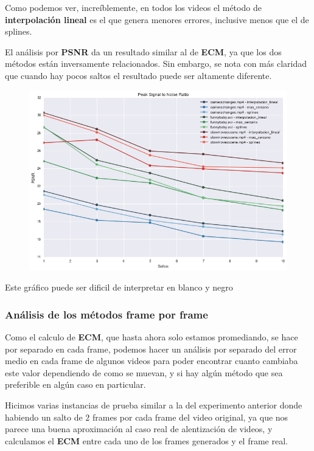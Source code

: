 Como podemos ver, incre\'iblemente, en todos los videos el m\'etodo de \textbf{interpolaci\'on
lineal} es el que genera menores errores, inclusive menos que el de splines.

El an\'alisis por \textbf{PSNR} da un resultado similar al de \textbf{ECM}, ya
que los dos m\'etodos est\'an inversamente relacionados. Sin embargo, se nota
con m\'as claridad que cuando hay pocos saltos el resultado puede ser altamente
diferente.

\begin{figure}[H]
\centering
\includegraphics[width=.95\textwidth]{graficos/psnr.png}
\end{figure}
\vspace{-2em}
\begin{tiny}Este gr\'afico puede ser dificil de interpretar en blanco y negro\end{tiny}
\vspace{2em}

\subsubsection{An\'alisis de los m\'etodos frame por frame}

Como el calculo de \textbf{ECM}, que hasta ahora solo estamos promediando, se
hace por separado en cada frame, podemos hacer un an\'alisis por separado del
error medio en cada frame de algunos videos para poder encontrar cuanto cambiaba
este valor dependiendo de como se muevan, y si hay alg\'un m\'etodo que sea
preferible en alg\'un caso en particular.

Hicimos varias instancias de prueba similar a la del experimento anterior donde
habiendo un salto de \(2\) frames por cada frame del video original, ya que nos
parece una buena aproximaci\'on al caso real de alentizaci\'on de videos, y
calculamos el \textbf{ECM} entre cada uno de los frames generados y el frame
real.

